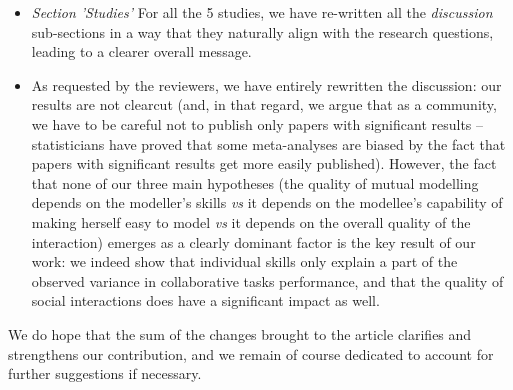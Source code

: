 \documentclass{article}
\begin{document}
\begin{itemize}
    \item \emph{Section 'Studies'} For all the 5 studies, we have re-written all
        the \emph{discussion} sub-sections in a
        way that they naturally align with the research questions, leading to a
        clearer overall message.

    \item As requested by the reviewers, we have entirely rewritten  the
        discussion: our results are not clearcut (and, in that regard, we argue
        that as a community, we have to be careful not to publish only
        papers with significant results -- statisticians have proved that some
        meta-analyses are biased by the fact that papers with significant results
        get more easily published). However, the fact that none of our three
        main hypotheses (the quality of mutual modelling depends on the modeller's
        skills \emph{vs} it depends on the modellee's capability of making herself easy
        to model \emph{vs} it depends on the overall quality of the interaction)
        emerges as a clearly dominant factor is the key result of our work: we indeed show that
        individual skills only explain a part of the observed variance in
        collaborative tasks performance, and that the quality of
        social interactions does have a significant impact as well.

\end{itemize}

We do hope that the sum of the changes brought to the article clarifies and
strengthens our contribution, and we remain of course dedicated to account for further
suggestions if necessary.
\end{document}
